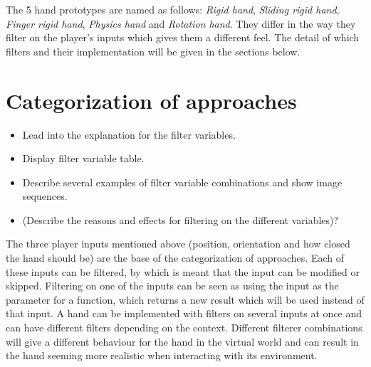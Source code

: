 The 5 hand prototypes are named as follows: \textit{Rigid hand}, \textit{Sliding rigid hand}, \textit{Finger rigid hand}, \textit{Physics hand} and \textit{Rotation hand}. They differ in the way they filter on the player's inputs which gives them a different feel. The detail of which filters and their implementation will be given in the sections below.


\section{Categorization of approaches}
\label{sec:categorizationOfApproaches}
\begin{itemize}
\setlength\itemsep{-0.1cm}
\item Lead into the explanation for the filter variables.
\item Display filter variable table.
\item Describe several examples of filter variable combinations and show image sequences.
\item (Describe the reasons and effects for filtering on the different variables)?
\end{itemize}

The three player inputs mentioned above (position, orientation and how closed the hand should be) are the base of the categorization of approaches. Each of these inputs can be filtered, by which is meant that the input can be modified or skipped. Filtering on one of the inputs can be seen as using the input as the parameter for a function, which returns a new result which will be used instead of that input. A hand can be implemented with filters on several inputs at once and can have different filters depending on the context. Different filterer combinations will give a different behaviour for the hand in the virtual world and can result in the hand seeming more realistic when interacting with its environment.

